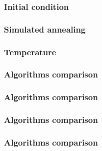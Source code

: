 \begin{frame}
	\frametitle{Initial condition}
	
\end{frame}

\begin{frame}
	\frametitle{Simulated annealing}
	
\end{frame}

\begin{frame}
	\frametitle{Temperature}
	
\end{frame}

\begin{frame}
	\frametitle{Algorithms comparison}
	
\end{frame}

\begin{frame}
	\frametitle{Algorithms comparison}
	
\end{frame}

\begin{frame}
	\frametitle{Algorithms comparison}
	
\end{frame}

\begin{frame}
	\frametitle{Algorithms comparison}
	
\end{frame}
